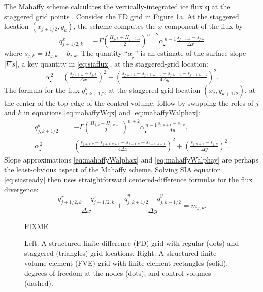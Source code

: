 \documentclass[11pt]{amsart}
\newcommand\bq{\mathbf{q}}
\newcommand{\grad}{\nabla}
\newcommand\alpharight{\alpha_{{}_{\blacktriangleright}}}
\newcommand\alphaup{\alpha_{{\!}_{\blacktriangle}}}
\begin{document}
The Mahaffy scheme calculates the vertically-integrated ice flux $\bq$ at the staggered grid points \cite[equations (19), (20)]{Mahaffy1976}.  Consider the FD grid in Figure \ref{fig:fdfemgrids}a.  At the staggered location $(x_{j+1/2},y_k)$, the scheme computes the $x$-component of the flux by
\begin{equation}
q^x_{j+1/2,k} = - \Gamma \left(\tfrac{H_{j,k} + H_{j+1,k}}{2}\right)^{n+2} \alpharight^{\,n-1} \tfrac{s_{j+1,k} - s_{j,k}}{\Delta x}  \label{eq:mahaffyWqx}
\end{equation}
where $s_{j,k} = H_{j,k} + b_{j,k}$.  The quantity ``$\alpharight$\!'' is an estimate of the surface slope $|\grad s|$, a key quantity in \eqref{eq:siaflux}, at the staggered-grid location:
\begin{equation}
\alpharight^{\,2} = \left(\tfrac{s_{j+1,k} - s_{j,k}}{\Delta x}\right)^2 + \left(\tfrac{s_{j,k+1} + s_{j+1,k+1} - s_{j,k-1} - s_{j+1,k-1}}{4 \Delta y}\right)^2.  \label{eq:mahaffyWalphax}
\end{equation}
The formula for the flux $q^y_{j,k+1/2}$ at the staggered-grid location $(x_j,y_{k+1/2})$, at the center of the top edge of the control volume, follow by swapping the roles of $j$ and $k$ in equations \eqref{eq:mahaffyWqx} and \eqref{eq:mahaffyWalphax}:
\begin{align}
q^y_{j,k+1/2} &= - \Gamma \left(\tfrac{H_{j,k} + H_{j,k+1}}{2}\right)^{n+2} \alphaup^{\,n-1} \tfrac{s_{j,k+1} - s_{j,k}}{\Delta y}, \label{eq:mahaffyWqy} \\
\alphaup^{\,2} &= \left(\tfrac{s_{j+1,k} + s_{j+1,k+1} - s_{j-1,k} - s_{j-1,k+1}}{4 \Delta x}\right)^2 + \left(\tfrac{s_{j,k+1} - s_{j,k}}{\Delta y}\right)^2.  \label{eq:mahaffyWalphay}
\end{align}
Slope approximations \eqref{eq:mahaffyWalphax} and \eqref{eq:mahaffyWalphay} are perhaps the least-obvious aspect of the Mahaffy scheme.  Solving SIA equation \eqref{eq:siasteady} then uses straightforward centered-difference formulas \cite{MortonMayers2005} for the flux divergence:
\begin{equation}
\frac{q^x_{j+1/2,k} - q^x_{j-1/2,k}}{\Delta x} + \frac{q^y_{j,k+1/2}- q^y_{j,k-1/2}}{\Delta y} = m_{j,k}.
\end{equation}

\begin{figure}[ht]
\begin{center}
FIXME
\end{center}
\caption{Left: A structured finite difference (FD) grid with regular (dots) and staggered (triangles) grid locations.  Right: A structured finite volume element (FVE) grid with finite element rectangles (solid), degrees of freedom at the nodes (dots), and control volumes (dashed).}
\label{fig:fdfemgrids}
\end{figure}
\end{document}
